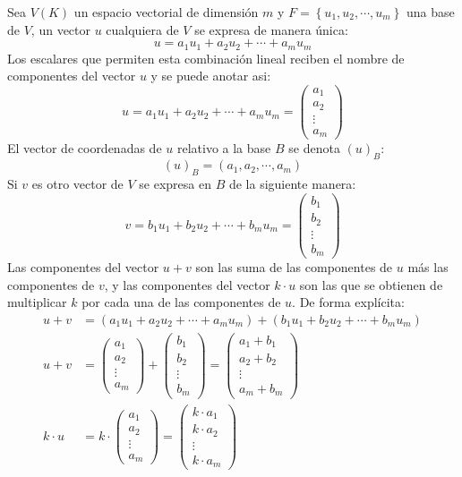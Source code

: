 Sea \(V(K)\) un espacio vectorial de dimensión \(m\) y \(F = \left\{u_1,u_2,\cdots,u_m\right\}\) una base de \(V\), un vector \(u\) cualquiera de \(V\) se expresa de manera única:
\[
  u = a_1 u_1 + a_2 u_2 + \cdots + a_m u_m
\]
Los escalares que permiten esta combinación lineal reciben el nombre de componentes del vector \(u\) y se puede anotar asi:
\[
  u = a_1 u_1 + a_2 u_2 + \cdots + a_m u_m = \begin{pmatrix}
    a_1 \\ a_2 \\ \vdots \\ a_m
  \end{pmatrix}
\]
El vector de coordenadas de \(u\) relativo a la base \(B\) se denota \((u)_B\):
\[
  (u)_B = (a_1, a_2, \cdots, a_m)
\]
Si \(v\) es otro vector de \(V\) se expresa en \(B\) de la siguiente manera:
\[
  v = b_1 u_1 + b_2 u_2 + \cdots + b_m u_m = \begin{pmatrix}
    b_1 \\ b_2 \\ \vdots \\ b_m
  \end{pmatrix}
\]
Las componentes del vector \(u+v\) son las suma de las componentes de \(u\) más las componentes de \(v\), y las componentes del vector \(k\cdot u\) son las que se obtienen de multiplicar \(k\) por cada una de las componentes de \(u\). De forma explícita:
\begin{align*}
  u + v &= (a_1 u_1 + a_2 u_2 + \cdots + a_m u_m) + (b_1 u_1 + b_2 u_2 + \cdots + b_m u_m) \\[3pt]
  u + v &= \begin{pmatrix}
    a_1 \\ a_2 \\ \vdots \\ a_m
  \end{pmatrix} + \begin{pmatrix}
    b_1 \\ b_2 \\ \vdots \\ b_m
  \end{pmatrix} = \begin{pmatrix}
    a_1 + b_1 \\ a_2 + b_2 \\ \vdots \\ a_m + b_m
  \end{pmatrix} \\[10pt]
  k\cdot u &= k \cdot \begin{pmatrix}
    a_1 \\ a_2 \\ \vdots \\ a_m
  \end{pmatrix} = \begin{pmatrix}
    k \cdot a_1 \\ k \cdot a_2 \\ \vdots \\ k \cdot a_m
  \end{pmatrix}
\end{align*}

